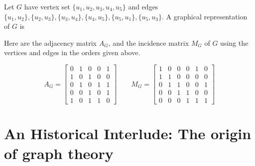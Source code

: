 \begin{exmp}\label{example01}
 Let $G$ have vertex set $\{u_1,u_2,u_3,u_4,u_5\}$ and edges  $\{u_1,u_2\}, 
 \{u_2,u_3\},\{u_3,u_4\},\{u_4,u_5\},\{u_5,u_1\}, \{u_5,u_3\}$. A graphical  representation of  $G$
 is 
 \begin{center}
\end{center}


 Here are the  adjacency matrix $A_G$, and the  incidence matrix $M_G$ of $G$
 using the vertices and edges in the orders given above.
 
 \[
  A_G=\left[
   \begin{matrix}
    0&1&0&0&1 \\ 
    1&0&1&0&0 \\ 
    0&1&0&1&1 \\ 
    0&0&1&0&1 \\ 
    1&0&1&1&0
   \end{matrix}
  \right]
  \qquad
  M_G=\left[
  \begin{matrix}
    1&0&0&0&1&0\\
    1&1&0&0&0&0 \\ 
    0&1&1&0&0&1 \\ 
    0&0&1&1&0&0 \\
    0&0&0&1&1&1
   \end{matrix}
  \right]
 \]
 
\end{exmp} 

\section{An Historical Interlude: The origin of graph theory}

